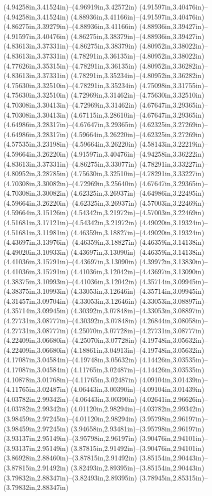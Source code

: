 (4.94258in,3.41524in)--(4.96919in,3.42572in) (4.91597in,3.40476in)--(4.94258in,3.41524in) (4.88936in,3.41166in)--(4.91597in,3.40476in) (4.86275in,3.39279in)--(4.88936in,3.41166in) (4.88936in,3.39427in)--(4.91597in,3.40476in) (4.86275in,3.38379in)--(4.88936in,3.39427in) (4.83613in,3.37331in)--(4.86275in,3.38379in) (4.80952in,3.38022in)--(4.83613in,3.37331in) (4.78291in,3.36135in)--(4.80952in,3.38022in) (4.77626in,3.35315in)--(4.78291in,3.36135in) (4.80952in,3.36282in)--(4.83613in,3.37331in) (4.78291in,3.35234in)--(4.80952in,3.36282in) (4.75630in,3.32510in)--(4.78291in,3.35234in) (4.75098in,3.31755in)--(4.75630in,3.32510in) (4.72969in,3.31462in)--(4.75630in,3.32510in) (4.70308in,3.30413in)--(4.72969in,3.31462in) (4.67647in,3.29365in)--(4.70308in,3.30413in) (4.67115in,3.28610in)--(4.67647in,3.29365in) (4.64986in,3.28317in)--(4.67647in,3.29365in) (4.62325in,3.27269in)--(4.64986in,3.28317in) (4.59664in,3.26220in)--(4.62325in,3.27269in) (4.57535in,3.23198in)--(4.59664in,3.26220in) (4.58143in,3.22219in)--(4.59664in,3.26220in) (4.91597in,3.40476in)--(4.94258in,3.36222in) (4.83613in,3.37331in)--(4.86275in,3.33077in) (4.78291in,3.33227in)--(4.80952in,3.28785in) (4.75630in,3.32510in)--(4.78291in,3.33227in) (4.70308in,3.30082in)--(4.72969in,3.25640in) (4.67647in,3.29365in)--(4.70308in,3.30082in) (4.62325in,3.26937in)--(4.64986in,3.22495in) (4.59664in,3.26220in)--(4.62325in,3.26937in) (4.57003in,3.22469in)--(4.59664in,3.15126in) (4.54342in,3.21972in)--(4.57003in,3.22469in) (4.51681in,3.17121in)--(4.54342in,3.21972in) (4.49020in,3.19324in)--(4.51681in,3.11981in) (4.46359in,3.18827in)--(4.49020in,3.19324in) (4.43697in,3.13976in)--(4.46359in,3.18827in) (4.46359in,3.14138in)--(4.49020in,3.10933in) (4.43697in,3.13090in)--(4.46359in,3.14138in) (4.41036in,3.15791in)--(4.43697in,3.13090in) (4.39972in,3.13830in)--(4.41036in,3.15791in) (4.41036in,3.12042in)--(4.43697in,3.13090in) (4.38375in,3.10993in)--(4.41036in,3.12042in) (4.35714in,3.09945in)--(4.38375in,3.10993in) (4.33053in,3.12646in)--(4.35714in,3.09945in) (4.31457in,3.09704in)--(4.33053in,3.12646in) (4.33053in,3.08897in)--(4.35714in,3.09945in) (4.30392in,3.07848in)--(4.33053in,3.08897in) (4.27731in,3.08777in)--(4.30392in,3.07848in) (4.26844in,3.08058in)--(4.27731in,3.08777in) (4.25070in,3.07728in)--(4.27731in,3.08777in) (4.22409in,3.06680in)--(4.25070in,3.07728in) (4.19748in,3.05632in)--(4.22409in,3.06680in) (4.18861in,3.04913in)--(4.19748in,3.05632in) (4.17087in,3.04584in)--(4.19748in,3.05632in) (4.14426in,3.03535in)--(4.17087in,3.04584in) (4.11765in,3.02487in)--(4.14426in,3.03535in) (4.10878in,3.01768in)--(4.11765in,3.02487in) (4.09104in,3.01439in)--(4.11765in,3.02487in) (4.06443in,3.00390in)--(4.09104in,3.01439in) (4.03782in,2.99342in)--(4.06443in,3.00390in) (4.02641in,2.96626in)--(4.03782in,2.99342in) (4.01120in,2.98294in)--(4.03782in,2.99342in) (3.98459in,2.97245in)--(4.01120in,2.98294in) (3.95798in,2.96197in)--(3.98459in,2.97245in) (3.94658in,2.93481in)--(3.95798in,2.96197in) (3.93137in,2.95149in)--(3.95798in,2.96197in) (3.90476in,2.94101in)--(3.93137in,2.95149in) (3.87815in,2.91492in)--(3.90476in,2.94101in) (3.86928in,2.88460in)--(3.87815in,2.91492in) (3.85154in,2.90443in)--(3.87815in,2.91492in) (3.82493in,2.89395in)--(3.85154in,2.90443in) (3.79832in,2.88347in)--(3.82493in,2.89395in) (3.78945in,2.85315in)--(3.79832in,2.88347in) 